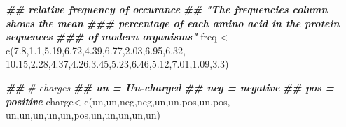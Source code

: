 \documentclass[
]{book}
\newenvironment{Shaded}{\begin{snugshade}}{\end{snugshade}}
\newcommand{\CommentTok}[1]{\textcolor[rgb]{0.56,0.35,0.01}{\textit{#1}}}
\newcommand{\DocumentationTok}[1]{\textcolor[rgb]{0.56,0.35,0.01}{\textbf{\textit{#1}}}}
\newcommand{\FloatTok}[1]{\textcolor[rgb]{0.00,0.00,0.81}{#1}}
\newcommand{\FunctionTok}[1]{\textcolor[rgb]{0.00,0.00,0.00}{#1}}
\newcommand{\NormalTok}[1]{#1}
\newcommand{\OtherTok}[1]{\textcolor[rgb]{0.56,0.35,0.01}{#1}}
\newcommand{\StringTok}[1]{\textcolor[rgb]{0.31,0.60,0.02}{#1}}
\begin{document}
\begin{Shaded}
\begin{Highlighting}[]
\DocumentationTok{\#\# relative frequency of occurance}
\DocumentationTok{\#\# "The frequencies column shows the mean }
\DocumentationTok{\#\#\# percentage of each amino acid in the protein sequences }
\DocumentationTok{\#\#\# of modern organisms"}
\NormalTok{freq        }\OtherTok{\textless{}{-}}\FunctionTok{c}\NormalTok{(}\FloatTok{7.8}\NormalTok{,}\FloatTok{1.1}\NormalTok{,}\FloatTok{5.19}\NormalTok{,}\FloatTok{6.72}\NormalTok{,}\FloatTok{4.39}\NormalTok{,}\FloatTok{6.77}\NormalTok{,}\FloatTok{2.03}\NormalTok{,}\FloatTok{6.95}\NormalTok{,}\FloatTok{6.32}\NormalTok{,}
                \FloatTok{10.15}\NormalTok{,}\FloatTok{2.28}\NormalTok{,}\FloatTok{4.37}\NormalTok{,}\FloatTok{4.26}\NormalTok{,}\FloatTok{3.45}\NormalTok{,}\FloatTok{5.23}\NormalTok{,}\FloatTok{6.46}\NormalTok{,}\FloatTok{5.12}\NormalTok{,}\FloatTok{7.01}\NormalTok{,}\FloatTok{1.09}\NormalTok{,}\FloatTok{3.3}\NormalTok{)}

\DocumentationTok{\#\#}
\CommentTok{\# charges}
\DocumentationTok{\#\# un = Un{-}charged}
\DocumentationTok{\#\# neg = negative}
\DocumentationTok{\#\# pos = positive}
\NormalTok{charge}\OtherTok{\textless{}{-}}\FunctionTok{c}\NormalTok{(}\StringTok{\textquotesingle{}un\textquotesingle{}}\NormalTok{,}\StringTok{\textquotesingle{}un\textquotesingle{}}\NormalTok{,}\StringTok{\textquotesingle{}neg\textquotesingle{}}\NormalTok{,}\StringTok{\textquotesingle{}neg\textquotesingle{}}\NormalTok{,}\StringTok{\textquotesingle{}un\textquotesingle{}}\NormalTok{,}\StringTok{\textquotesingle{}un\textquotesingle{}}\NormalTok{,}\StringTok{\textquotesingle{}pos\textquotesingle{}}\NormalTok{,}\StringTok{\textquotesingle{}un\textquotesingle{}}\NormalTok{,}\StringTok{\textquotesingle{}pos\textquotesingle{}}\NormalTok{,}
          \StringTok{\textquotesingle{}un\textquotesingle{}}\NormalTok{,}\StringTok{\textquotesingle{}un\textquotesingle{}}\NormalTok{,}\StringTok{\textquotesingle{}un\textquotesingle{}}\NormalTok{,}\StringTok{\textquotesingle{}un\textquotesingle{}}\NormalTok{,}\StringTok{\textquotesingle{}un\textquotesingle{}}\NormalTok{,}\StringTok{\textquotesingle{}pos\textquotesingle{}}\NormalTok{,}\StringTok{\textquotesingle{}un\textquotesingle{}}\NormalTok{,}\StringTok{\textquotesingle{}un\textquotesingle{}}\NormalTok{,}\StringTok{\textquotesingle{}un\textquotesingle{}}\NormalTok{,}\StringTok{\textquotesingle{}un\textquotesingle{}}\NormalTok{,}\StringTok{\textquotesingle{}un\textquotesingle{}}\NormalTok{)}


\end{Highlighting}
\end{Shaded}
\end{document}
